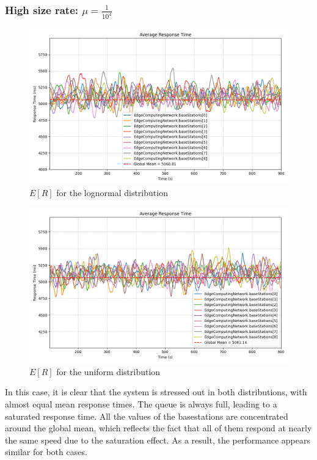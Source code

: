 \documentclass{report}
\begin{document}
\subsubsection*{High size rate: $\mu=\frac{1}{10^4}$}

\begin{figure}[H]
    \centering
    \includegraphics[width=\textwidth]{img/plots/log_1e4_B/resptime.png}
    \caption{$E[R]$ for the lognormal distribution}
\end{figure}

\begin{figure}[H]
    \centering
    \includegraphics[width=\textwidth]{img/plots/uni_1e4_B/resptime.png}
    \caption{$E[R]$ for the uniform distribution}
\end{figure}

In this case, it is clear that the system is stressed out in both distributions, with almost equal mean response times. The queue is always full, leading to a saturated response time.
All the values of the basestations are concentrated around the global mean, which reflects the fact that all of them respond at nearly the same speed due to the saturation effect.
As a result, the performance appears similar for both cases.
\end{document}
